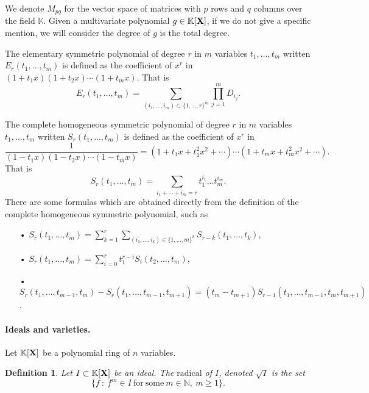 \documentclass[11pt]{article}
\numberwithin{Property}{section}
\numberwithin{Theorem}{section}
\numberwithin{Proposition}{section}
\numberwithin{Lemma}{section}
\numberwithin{Corollary}{section}
\newtheorem{Definition}{Definition}%
\numberwithin{Definition}{section}
\numberwithin{Remark}{section}
\numberwithin{Conjecture}{section}
\numberwithin{Problem}{section}
\numberwithin{Claim}{section}
\theoremstyle{definition}
\numberwithin{Example}{section}
\renewcommand{\geq}{\geqslant}
\newcommand{\field}{\mathbb{K}} %
\newcommand{\mat}[1]{\mathbf{\MakeUppercase{#1}}} %
\begin{document}
We denote $M_{pq}$ for the vector space of matrices with $p$ rows and $q$ columns over the field $\field$. Given a multivariate polynomial $g \in \field[\mat{X}]$, if we do not give a specific mention, we will consider the degree of $g$ is the total degree.  %

The elementary symmetric polynomial of degree $r$ in $m$ variables $t_1, \ldots, t_m$ written $E_{r}(t_1, \ldots, t_m)$ is defined as the coefficient of $x^r$ in $(1+t_1x)(1+t_2x)\cdots(1+t_mx)$. That is
\[E_{r}(t_1, \ldots, t_m) = \sum_{(i_1,\ldots,i_{m}) \subset \{1, \ldots, r\}^{m}}\prod_{j =1}^{m}D_{i_j}.\]

The complete homogeneous symmetric polynomial of degree $r$ in $m$ variables $t_1, \ldots, t_m$ written $S_{r}(t_1, \ldots, t_m)$ is defined as the coefficient of $x^{r}$ in $$\frac{1}{(1-t_1x)(1-t_2x)\cdots(1-t_mx)} = (1+t_1x + t_1^2x^2 + \cdots)\cdots(1+t_mx + t_m^2x^2 + \cdots).$$
That is 
\[
S_r(t_1, \ldots, t_m) = \sum_{i_1 + \cdots + i_m = r} t_1^{i_1}\ldots t_m^{i_m}. 
\]
There are some formulas which are obtained directly from the definition of the complete homogeneous symmetric polynomial, such as 
\begin{itemize}
\item[•] $S_{r}(t_1, \ldots, t_m) =  \sum\limits_{k=1}^r\sum\limits_{(i_1, \ldots, i_k) \in \{1, \ldots, m\}^k}S_{r-k}(t_1, \ldots, t_k)$,
\item[•] $S_{r}(t_1, \ldots, t_{m}) = \sum\limits_{i=0}^{r}t_1^{r-i}S_i(t_2, \ldots, t_m)$,
\item[•] $S_r(t_1, \ldots, t_{m-1}, t_m) - S_r(t_1, \ldots, t_{m-1}, t_{m+1}) = (t_m - t_{m+1})S_{r-1}(t_1, \ldots, t_{m-1}, t_m, t_{m+1})$. 
\end{itemize}
\paragraph{Ideals and varieties.} Let $\field[\mat{X}]$ be a polynomial ring of $n$ variables. 
\begin{Definition} Let $I \subset \field[\mat{X}]$ be an ideal. The $\mathrm{radical}$ of $I$, denoted $\sqrt{I}$ is the set 
\[
\{f \ : \ f^m \in I \ \mathrm{for \ some} \ m \in \mathbb{N}, \ m \geq 1\}.
\]
\end{Definition}
\end{document}
